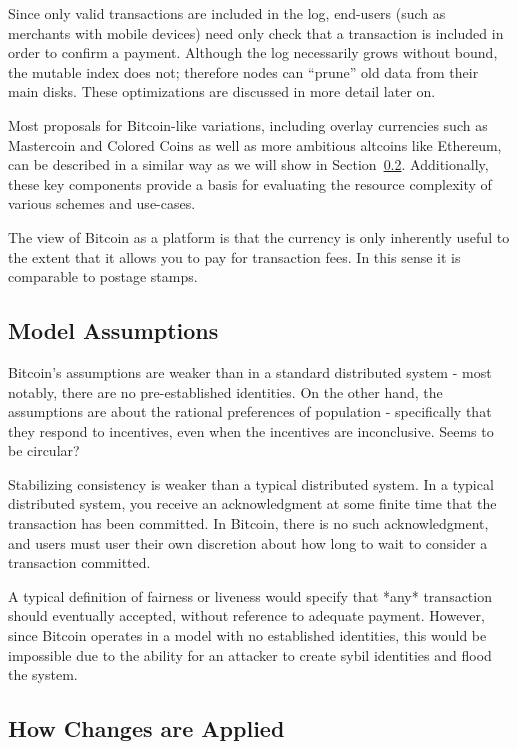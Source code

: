 Since only valid transactions are included in the log, end-users (such as merchants with mobile devices) need only check that a transaction is included in order to confirm a payment. Although the log necessarily grows without bound, the mutable index does not; therefore nodes can ``prune'' old data from their main disks. These optimizations are discussed in more detail later on.

Most proposals for Bitcoin-like variations, including overlay currencies such as Mastercoin and Colored Coins as well as more ambitious altcoins like Ethereum, can be described in a similar way as we will show in Section~\ref{}. Additionally, these key components provide a basis for evaluating the resource complexity of various schemes and use-cases.

The view of Bitcoin as a platform is that the currency is only inherently useful to the extent that it allows you to pay for transaction fees. In this sense it is comparable to postage stamps.

\subsection{Model Assumptions}

Bitcoin's assumptions are weaker than in a standard distributed system - most notably, there are no pre-established identities. On the other hand, the assumptions are about the rational preferences of population - specifically that they respond to incentives, even when the incentives are inconclusive. Seems to be circular?

Stabilizing consistency is weaker than a typical distributed system. In a typical distributed system, you receive an acknowledgment at some finite time that the transaction has been committed. In Bitcoin, there is no such acknowledgment, and users must user their own discretion about how long to wait to consider a transaction committed. 

A typical definition of fairness or liveness would specify that *any* transaction should eventually accepted, without reference to adequate payment. However, since Bitcoin operates in a model with no established identities, this would be impossible due to the ability for an attacker to create sybil identities and flood the system.

\subsection{How Changes are Applied}


